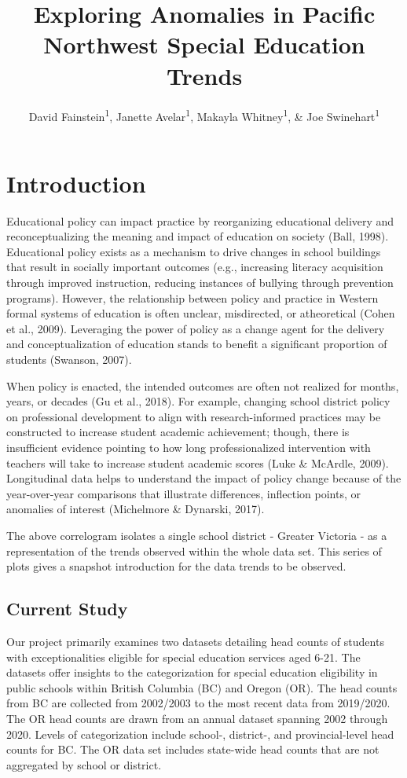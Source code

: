 \documentclass[
  english,
  man,floatsintext]{apa6}
\title{Exploring Anomalies in Pacific Northwest Special Education Trends}
\author{David Fainstein\textsuperscript{1}, Janette Avelar\textsuperscript{1}, Makayla Whitney\textsuperscript{1}, \& Joe Swinehart\textsuperscript{1}}
\date{}
\affiliation{\vspace{0.5cm}\textsuperscript{1} University of Oregon}
\begin{document}
\maketitle

\hypertarget{introduction}{%
\section{Introduction}\label{introduction}}

Educational policy can impact practice by reorganizing educational delivery and reconceptualizing the meaning and impact of education on society (Ball, 1998). Educational policy exists as a mechanism to drive changes in school buildings that result in socially important outcomes (e.g., increasing literacy acquisition through improved instruction, reducing instances of bullying through prevention programs). However, the relationship between policy and practice in Western formal systems of education is often unclear, misdirected, or atheoretical (Cohen et al., 2009). Leveraging the power of policy as a change agent for the delivery and conceptualization of education stands to benefit a significant proportion of students (Swanson, 2007).

When policy is enacted, the intended outcomes are often not realized for months, years, or decades (Gu et al., 2018). For example, changing school district policy on professional development to align with research-informed practices may be constructed to increase student academic achievement; though, there is insufficient evidence pointing to how long professionalized intervention with teachers will take to increase student academic scores (Luke \& McArdle, 2009). Longitudinal data helps to understand the impact of policy change because of the year-over-year comparisons that illustrate differences, inflection points, or anomalies of interest (Michelmore \& Dynarski, 2017).

The above correlogram isolates a single school district - Greater Victoria - as a representation of the trends observed within the whole data set. This series of plots gives a snapshot introduction for the data trends to be observed.

\hypertarget{current-study}{%
\subsection{Current Study}\label{current-study}}

Our project primarily examines two datasets detailing head counts of students with exceptionalities eligible for special education services aged 6-21. The datasets offer insights to the categorization for special education eligibility in public schools within British Columbia (BC) and Oregon (OR). The head counts from BC are collected from 2002/2003 to the most recent data from 2019/2020. The OR head counts are drawn from an annual dataset spanning 2002 through 2020. Levels of categorization include school-, district-, and provincial-level head counts for BC. The OR data set includes state-wide head counts that are not aggregated by school or district.
\end{document}
